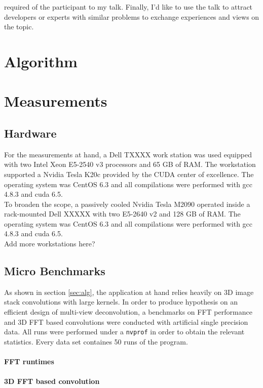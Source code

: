 \documentclass [12pt]{article}
\begin{document}
required of the participant to my talk. Finally, I'd like to use the talk to attract developers or experts with similar problems to exchange experiences and views on the topic.
\section[sec:alg]{Algorithm}
\section{Measurements}

\subsection{Hardware}
For the measurements at hand, a Dell TXXXX work station was used equipped with two Intel Xeon E5-2540 v3 processors and 65 GB of RAM. The workstation supported a Nvidia Tesla K20c provided by the CUDA center of excellence. The operating system was CentOS 6.3 and all compilations were performed with gcc 4.8.3 and cuda 6.5.\\ 
To broaden the scope, a passively cooled Nvidia Tesla M2090 operated inside a rack-mounted Dell XXXXX with two E5-2640 v2 and 128 GB of RAM. The operating system was CentOS 6.3 and all compilations were performed with gcc 4.8.3 and cuda 6.5.\\
 Add more workstations here?
\subsection{Micro Benchmarks}

As shown in section \ref{sec:alg}, the application at hand relies heavily on 3D image stack convolutions with large kernels. In order to produce hypothesis on an efficient design of multi-view deconvolution, a benchmarks on FFT performance and 3D FFT based convolutions were conducted with artificial single precision data. All runs were performed under a \texttt{nvprof} in order to obtain the relevant statistics. Every data set containes 50 runs of the program. 

\paragraph{FFT runtimes}

\paragraph{3D FFT based convolution}
\end{document}
